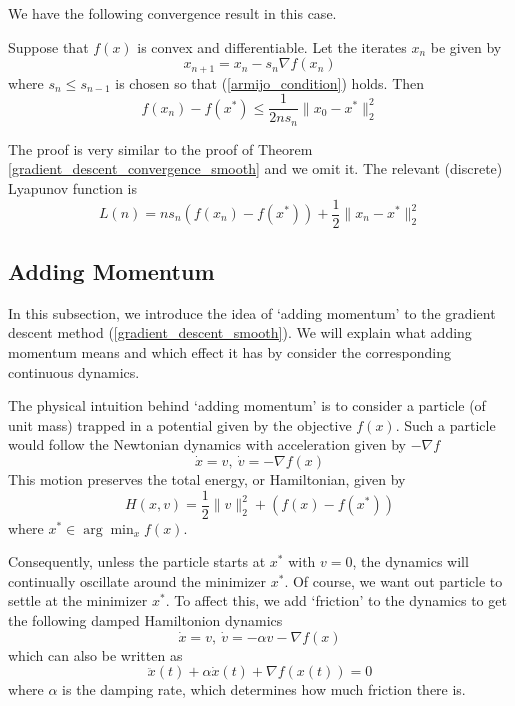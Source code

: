  We have the following convergence result in this case.
 \begin{theorem}
  Suppose that $f(x)$ is convex and differentiable. Let the iterates $x_n$ be given by
  \begin{equation}
   x_{n+1} = x_n - s_n\nabla f(x_n)
  \end{equation}
  where $s_n \leq s_{n-1}$ is chosen so that (\ref{armijo_condition}) holds. Then
  \begin{equation}
   f(x_n) - f(x^*) \leq \frac{1}{2ns_n}\|x_0 - x^*\|_2^2
  \end{equation}
 \end{theorem}
 The proof is very similar to the proof of Theorem \ref{gradient_descent_convergence_smooth} and we omit it. The relevant
 (discrete) Lyapunov function is
 \begin{equation}
  L(n) = ns_n(f(x_n) - f(x^*)) + \frac{1}{2}\|x_n - x^*\|_2^2
 \end{equation}

 
\subsection{Adding Momentum}
In this subsection, we introduce the idea of `adding momentum' to the gradient descent method (\ref{gradient_descent_smooth}).
We will explain what adding momentum means and which effect it has by consider the corresponding 
continuous dynamics.

The physical intuition behind `adding momentum' is to consider a particle (of unit mass) trapped in a potential given
by the objective $f(x)$. Such a particle would follow the Newtonian dynamics with acceleration given by $-\nabla f$
\begin{equation}
 \dot{x} = v,~\dot{v} = - \nabla f(x)
\end{equation}
This motion preserves the total energy, or Hamiltonian, given by
\begin{equation}\label{hamiltonian}
 H(x,v) = \frac{1}{2}\|v\|_2^2 + (f(x) - f(x^*))
\end{equation}
where $x^*\in \arg\min_x f(x)$.

Consequently, unless the particle starts at $x^*$ with $v = 0$, the dynamics will continually oscillate around the
minimizer $x^*$. Of course, we want out particle to settle at the minimizer $x^*$. To affect this, we add `friction'
to the dynamics to get the following damped Hamiltonion dynamics
\begin{equation}\label{momentum_descent_dynamics_smooth}
 \dot{x} = v,~\dot{v} = -\alpha v - \nabla f(x)
\end{equation}
which can also be written as
\begin{equation}
 \ddot{x}(t) + \alpha \dot{x}(t) + \nabla f(x(t)) = 0
\end{equation}
where $\alpha$ is the damping rate, which determines how much friction there is.

